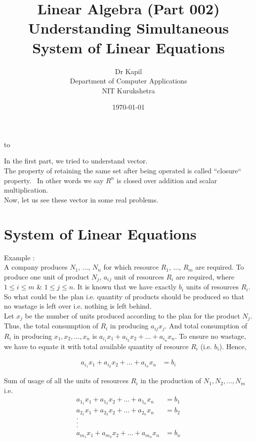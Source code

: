 to\documentclass{article}
\title{Linear Algebra (Part 002)\\Understanding Simultaneous System of Linear Equations}
\author{Dr Kapil\\Department of Computer Applications\\ NIT Kurukshetra}
\date{\today}
\begin{document}
\maketitle


In the first part, we tried to understand vector.\\

The property of retaining the same set after being operated is called ``closure`` property.~
In other words we say $R^n$ is closed over addition and scalar multiplication.\\

Now, let us see these vector in some real problems.\\

\section{System of Linear Equations}\label{first_section}
    Example : \\

A company produces $N_1$, ..., $N_n$ for which resource $R_1$, ..., $R_m$ are required. To produce one unit of product $N_j$, $a_i{}_j$ unit of resources $R_i$ are required, where $1 \leq i \leq m$ \& $1 \leq j \leq n$. It is known that we have exactly $b_i$ units of resources $R_i$. So what could be the plan i.e. quantity of products should be produced so that no wastage is left over i.e. nothing is left behind.\\

Let $x_j$ be the number of units produced according to the plan for the product $N_j$. Thus, the total consumption of $R_i$ in producing $a_{ij}x_j$. And total consumption of $R_i$ in producing $x_1,x_2,...,x_n$ is $a_i_1x_1 + a_i_2x_2 + ... + a_i_nx_n$. To ensure no wastage, we have to equate it with total available quantity of resource $R_i$ (i.e. $b_i$). Hence,

\begin{align}
   a_i_1x_1 + a_i_2x_2 + ... + a_i_nx_n & = b_i
\end{align}

Sum of usage of all the units of resources \(R_i\) in the production of \( N_1, N_2, ..., N_m\)\\

i.e.\\
\begin{align}
    a_1_1x_1 + a_1_2x_2 + ... + a_1_nx_n &= b_1\nonumber\\
    a_2_1x_1 + a_2_2x_2 + ... + a_2_nx_n &= b_2\nonumber\\
    .\nonumber\\
    .\nonumber\\
    .\nonumber\\
    a_m_1x_1 + a_m_2x_2 + ... + a_m_nx_n &= b_n\nonumber\\
\end{align}
\end{document}
